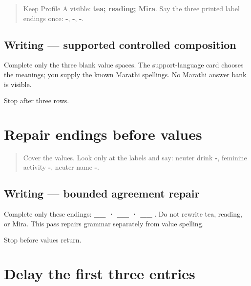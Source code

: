 \label{lesson:MR-A1F08-last-three-supported}



\begin{quote}
Keep Profile A visible: \textbf{tea; reading; Mira}. Say the three printed label endings once: \textbf{-}, \textbf{-}, \textbf{-}.
\end{quote}

\subsection*{Writing — supported controlled composition}
Complete only the three blank value spaces. The support-language card chooses the meanings; you supply the known Marathi spellings. No Marathi answer bank is visible.

\begin{tcolorbox}[breakable,colback=teal!4,colframe=teal!35!black,title={Before you move on}]
Stop after three rows.
\end{tcolorbox}
\section[\texorpdfstring{-\mr{ते} · -\mr{ती} · -\mr{चे} (-te · -tī · -ce)}{-ते · -ती · -चे (-te · -tī · -ce)}]{Repair endings before values}

\label{lesson:MR-A1F09-last-three-agreement}



\begin{quote}
Cover the values. Look only at the labels and say: neuter drink \textbf{-}, feminine activity \textbf{-}, neuter name \textbf{-}.
\end{quote}

\subsection*{Writing — bounded agreement repair}
Complete only these endings: \textbf{\_\_  · \_\_  · \_\_ }. Do not rewrite tea, reading, or Mira. This pass repairs grammar separately from value spelling.

\begin{tcolorbox}[breakable,colback=teal!4,colframe=teal!35!black,title={Before you move on}]
Stop before values return.
\end{tcolorbox}
\section[\texorpdfstring{\mr{नाव}: \mr{अरुण} · \mr{शहर}: \mr{पुणे} · \mr{भाषा}: \mr{मराठी}}{नाव: अरुण · शहर: पुणे · भाषा: मराठी}]{Delay the first three entries}

